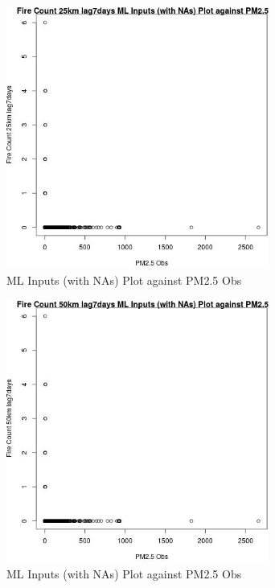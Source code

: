 \begin{figure} 
\centering  
\includegraphics[width=0.77\textwidth]{Code_Outputs/Report_ML_input_PM25_Step4_part_e_de_duplicated_aves_compiled_2019-05-21wNAs_Fire_Count_25km_lag7daysvPM25_Obs.jpg} 
\caption{\label{fig:Report_ML_input_PM25_Step4_part_e_de_duplicated_aves_compiled_2019-05-21wNAsFire_Count_25km_lag7daysvPM25_Obs}ML Inputs (with NAs) Plot against PM2.5 Obs} 
\end{figure} 
 

\clearpage 

\begin{figure} 
\centering  
\includegraphics[width=0.77\textwidth]{Code_Outputs/Report_ML_input_PM25_Step4_part_e_de_duplicated_aves_compiled_2019-05-21wNAs_Fire_Count_50km_lag7daysvPM25_Obs.jpg} 
\caption{\label{fig:Report_ML_input_PM25_Step4_part_e_de_duplicated_aves_compiled_2019-05-21wNAsFire_Count_50km_lag7daysvPM25_Obs}ML Inputs (with NAs) Plot against PM2.5 Obs} 
\end{figure} 
 

